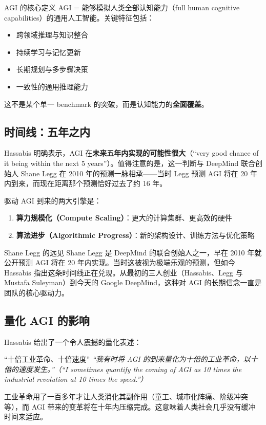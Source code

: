 \documentclass[a4paper]{article}
\begin{document}
\begin{importantbox}{AGI 的核心定义}
AGI = 能够模拟人类全部认知能力（full human cognitive capabilities）的通用人工智能。关键特征包括：
\begin{itemize}
    \item 跨领域推理与知识整合
    \item 持续学习与记忆更新
    \item 长期规划与多步骤决策
    \item 一致性的通用推理能力
\end{itemize}
这不是某个单一 benchmark 的突破，而是认知能力的\textbf{全面覆盖}。
\end{importantbox}

\subsection{时间线：五年之内}

Hassabis 明确表示，AGI 在\textbf{未来五年内实现的可能性很大}（``very good chance of it being within the next 5 years''）。值得注意的是，这一判断与 DeepMind 联合创始人 Shane Legg 在 2010 年的预测一脉相承——当时 Legg 预测 AGI 将在 20 年内到来，而现在距离那个预测恰好过去了约 16 年。

驱动 AGI 到来的两大引擎是：
\begin{enumerate}
    \item \textbf{算力规模化（Compute Scaling）}：更大的计算集群、更高效的硬件
    \item \textbf{算法进步（Algorithmic Progress）}：新的架构设计、训练方法与优化策略
\end{enumerate}

\begin{knowledgebox}{Shane Legg 的远见}
Shane Legg 是 DeepMind 的联合创始人之一，早在 2010 年就公开预测 AGI 将在 20 年内实现。当时这被视为极端乐观的预测，但如今 Hassabis 指出这条时间线正在兑现。从最初的三人创业（Hassabis、Legg 与 Mustafa Suleyman）到今天的 Google DeepMind，这种对 AGI 的长期信念一直是团队的核心驱动力。
\end{knowledgebox}

\subsection{量化 AGI 的影响}

Hassabis 给出了一个令人震撼的量化表述：

\begin{importantbox}{``十倍工业革命、十倍速度''}
\textit{``我有时将 AGI 的到来量化为十倍的工业革命，以十倍的速度发生。''（``I sometimes quantify the coming of AGI as 10 times the industrial revolution at 10 times the speed.''）}

工业革命用了一百多年才让人类消化其副作用（童工、城市化阵痛、阶级冲突等），而 AGI 带来的变革将在十年内压缩完成。这意味着人类社会几乎没有缓冲时间来适应。
\end{importantbox}
\end{document}
